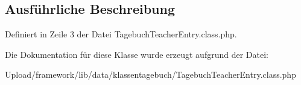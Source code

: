\subsection{Ausführliche Beschreibung}


Definiert in Zeile 3 der Datei Tagebuch\+Teacher\+Entry.\+class.\+php.



Die Dokumentation für diese Klasse wurde erzeugt aufgrund der Datei\+:\begin{DoxyCompactItemize}
\item 
Upload/framework/lib/data/klassentagebuch/Tagebuch\+Teacher\+Entry.\+class.\+php\end{DoxyCompactItemize}
